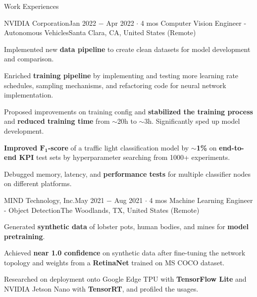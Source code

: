 \documentclass{resume}
\begin{document}
\begin{rSection}{Work Experiences}
    \begin{rSubsection}{NVIDIA Corporation}{Jan 2022 \(-\) Apr 2022 \(\cdot\) 4 mos}
        {Computer Vision Engineer - Autonomous Vehicles}{Santa Clara, CA, United States (Remote)}
        \item Implemented new \textbf{data pipeline} to create clean datasets for model development and comparison.
        \item Enriched \textbf{training pipeline} by implementing and testing more learning rate schedules, sampling mechanisms, and refactoring code for neural network implementation.
        \item Proposed improvements on training config and \textbf{stabilized the training process} and \textbf{reduced training time} from \(\sim\)20h to \(\sim\)3h. Significantly sped up model development.
        \item \textbf{Improved \(\boldsymbol{F_{1}}\)-score} of a traffic light classification model by \(\sim\)\textbf{1\%} on \textbf{end-to-end KPI} test sets by hyperparameter searching from 1000+ experiments.
        \item Debugged memory, latency, and \textbf{performance tests} for multiple classifier nodes on different platforms.
    \end{rSubsection}

    \begin{rSubsection}{MIND Technology, Inc.}{May 2021 \(-\) Aug 2021 \(\cdot\) 4 mos}
        {Machine Learning Engineer - Object Detection}{The Woodlands, TX, United States (Remote)}
        \item Generated \textbf{synthetic data} of lobster pots, human bodies, and mines for \textbf{model pretraining}.
        \item Achieved \textbf{near 1.0 confidence} on synthetic data after fine-tuning the network topology and weights from a \textbf{RetinaNet} trained on MS COCO dataset.
        \item Researched on deployment onto Google Edge TPU with \textbf{TensorFlow Lite} and NVIDIA Jetson Nano with \textbf{TensorRT}, and profiled the usages.
    \end{rSubsection}

\end{rSection}
\end{document}
